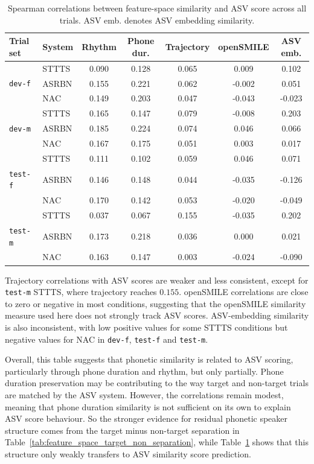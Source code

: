 \documentclass[12pt,leqno,a4paper]{article}
\begin{document}
\begin{table}[H]
\centering
\small
\begin{tabular}{llccccc}
\hline
Trial set & System & Rhythm & Phone dur. & Trajectory & openSMILE & ASV emb. \\
\hline
  & STTTS & 0.090 & \color{darkgreen}0.128 & 0.065 & 0.009 & 0.102 \\
\texttt{dev-f} & ASRBN & 0.155 & \color{darkgreen}0.221 & 0.062 & -0.002 & 0.051 \\
  & NAC   & 0.149 & \color{darkgreen}0.203 & 0.047 & -0.043 & -0.023 \\
\hline
  & STTTS & \color{darkgreen}0.165 & 0.147 & 0.079 & -0.008 & 0.203 \\
\texttt{dev-m} & ASRBN & 0.185 & \color{darkgreen}0.224 & 0.074 & 0.046 & 0.066 \\
  & NAC   & 0.167 & \color{darkgreen}0.175 & 0.051 & 0.003 & 0.017 \\
\hline
 & STTTS & \color{darkgreen}0.111 & 0.102 & 0.059 & 0.046 & 0.071 \\
\texttt{test-f} & ASRBN & 0.146 & \color{darkgreen}0.148 & 0.044 & -0.035 & -0.126 \\
& NAC   & \color{darkgreen}0.170 & 0.142 & 0.053 & -0.020 & -0.049 \\
\hline
 & STTTS & 0.037 & 0.067 & \color{darkgreen}0.155 & -0.035 & 0.202 \\
\texttt{test-m} & ASRBN & 0.173 & \color{darkgreen}0.218 & 0.036 & 0.000 & 0.021 \\
 & NAC   & \color{darkgreen}0.163 & 0.147 & 0.003 & -0.024 & -0.090 \\
\hline
\end{tabular}
\caption{Spearman correlations between feature-space similarity and ASV score across all trials. ASV emb. denotes ASV embedding similarity.}
\label{tab:feature_space_similarity_asv}
\end{table}

Trajectory correlations with ASV scores are weaker and less consistent, except for \texttt{test-m} STTTS, where trajectory reaches $0.155$. openSMILE correlations are close to zero or negative in most conditions, suggesting that the openSMILE similarity measure used here does not strongly track ASV scores. ASV-embedding similarity is also inconsistent, with low positive values for some STTTS conditions but negative values for NAC in \texttt{dev-f}, \texttt{test-f} and \texttt{test-m}. 

Overall, this table suggests that phonetic similarity is related to ASV scoring, particularly through phone duration and rhythm, but only partially. Phone duration preservation may be contributing to the way target and non-target trials are matched by the ASV system. However, the correlations remain modest, meaning that phone duration similarity is not sufficient on its own to explain ASV score behaviour. So the stronger evidence for residual phonetic speaker structure comes from the target minus non-target separation in Table~\ref{tab:feature_space_target_non_separation}, while Table~\ref{tab:feature_space_similarity_asv} shows that this structure only weakly transfers to ASV similarity score prediction.
\end{document}
